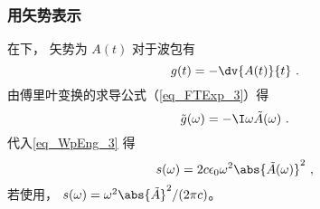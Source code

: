 \subsubsection{用矢势表示}
在下， 矢势为 $A(t)$ 对于波包有
\begin{equation}
g(t) = -\dv{A(t)}{t}~.
\end{equation}
由傅里叶变换的求导公式（\autoref{eq_FTExp_3}）得
\begin{equation}\label{eq_WpEng_4}
\tilde g(\omega) = -\I \omega \tilde A(\omega)~.
\end{equation}
代入\autoref{eq_WpEng_3} 得
\begin{equation}\label{eq_WpEng_5}
s(\omega) = 2c\epsilon_0 \omega^2 \abs{\tilde A(\omega)}^2~,
\end{equation}
若使用， $s(\omega) = \omega^2 \abs{\tilde A}^2/(2\pi c)$。
